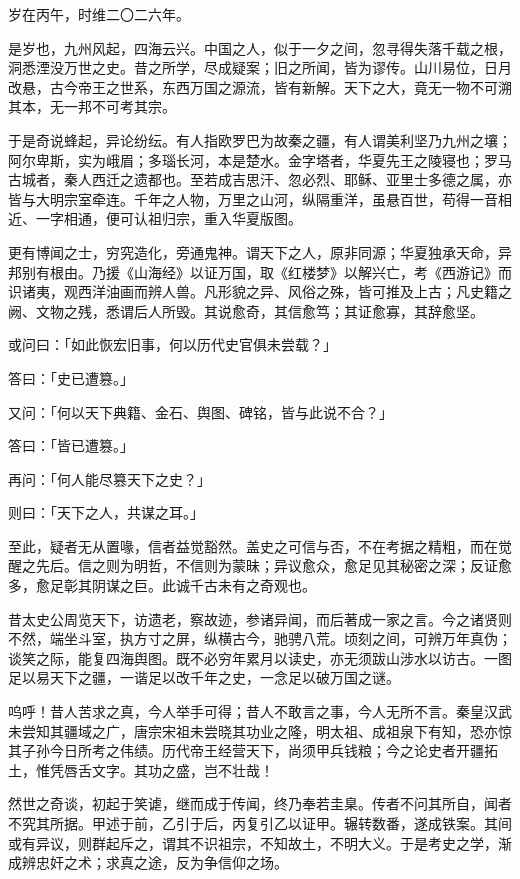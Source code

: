 岁在丙午，时维二〇二六年。

是岁也，九州风起，四海云兴。中国之人，似于一夕之间，忽寻得失落千载之根，洞悉湮没万世之史。昔之所学，尽成疑案；旧之所闻，皆为谬传。山川易位，日月改悬，古今帝王之世系，东西万国之源流，皆有新解。天下之大，竟无一物不可溯其本，无一邦不可考其宗。

于是奇说蜂起，异论纷纭。有人指欧罗巴为故秦之疆，有人谓美利坚乃九州之壤；阿尔卑斯，实为峨眉；多瑙长河，本是楚水。金字塔者，华夏先王之陵寝也；罗马古城者，秦人西迁之遗都也。至若成吉思汗、忽必烈、耶稣、亚里士多德之属，亦皆与大明宗室牵连。千年之人物，万里之山河，纵隔重洋，虽悬百世，苟得一音相近、一字相通，便可认祖归宗，重入华夏版图。

更有博闻之士，穷究造化，旁通鬼神。谓天下之人，原非同源；华夏独承天命，异邦别有根由。乃援《山海经》以证万国，取《红楼梦》以解兴亡，考《西游记》而识诸夷，观西洋油画而辨人兽。凡形貌之异、风俗之殊，皆可推及上古；凡史籍之阙、文物之残，悉谓后人所毁。其说愈奇，其信愈笃；其证愈寡，其辞愈坚。

或问曰：「如此恢宏旧事，何以历代史官俱未尝载？」

答曰：「史已遭篡。」

又问：「何以天下典籍、金石、舆图、碑铭，皆与此说不合？」

答曰：「皆已遭篡。」

再问：「何人能尽篡天下之史？」

则曰：「天下之人，共谋之耳。」

至此，疑者无从置喙，信者益觉豁然。盖史之可信与否，不在考据之精粗，而在觉醒之先后。信之则为明哲，不信则为蒙昧；异议愈众，愈足见其秘密之深；反证愈多，愈足彰其阴谋之巨。此诚千古未有之奇观也。

昔太史公周览天下，访遗老，察故迹，参诸异闻，而后著成一家之言。今之诸贤则不然，端坐斗室，执方寸之屏，纵横古今，驰骋八荒。顷刻之间，可辨万年真伪；谈笑之际，能复四海舆图。既不必穷年累月以读史，亦无须跋山涉水以访古。一图足以易天下之疆，一谐足以改千年之史，一念足以破万国之谜。

呜呼！昔人苦求之真，今人举手可得；昔人不敢言之事，今人无所不言。秦皇汉武未尝知其疆域之广，唐宗宋祖未尝晓其功业之隆，明太祖、成祖泉下有知，恐亦惊其子孙今日所考之伟绩。历代帝王经营天下，尚须甲兵钱粮；今之论史者开疆拓土，惟凭唇舌文字。其功之盛，岂不壮哉！

然世之奇谈，初起于笑谑，继而成于传闻，终乃奉若圭臬。传者不问其所自，闻者不究其所据。甲述于前，乙引于后，丙复引乙以证甲。辗转数番，遂成铁案。其间或有异议，则群起斥之，谓其不识祖宗，不知故土，不明大义。于是考史之学，渐成辨忠奸之术；求真之途，反为争信仰之场。

